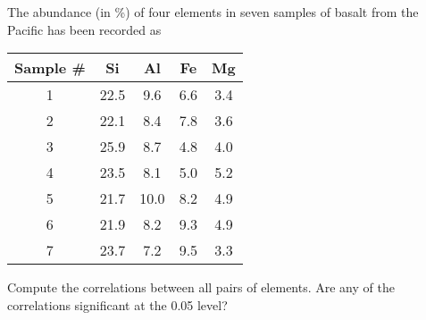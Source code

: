 \begin{problem}
The abundance (in \%) of four elements in seven samples of basalt from the Pacific has been recorded as
\begin{table}[H]
\centering
\begin{tabular}{|c|c|c|c|c|} \hline
\bf{Sample \#}	& \bf{Si} & \bf{Al} & \bf{Fe} & \bf{Mg} \\ \hline
1	& 22.5	& 9.6	& 6.6	& 3.4 \\ \hline
2	& 22.1	& 8.4	& 7.8	& 3.6 \\ \hline
3	& 25.9	& 8.7	& 4.8	& 4.0 \\ \hline
4	& 23.5	& 8.1	& 5.0	& 5.2 \\ \hline
5	& 21.7	& 10.0	& 8.2	& 4.9 \\ \hline
6	& 21.9	& 8.2	& 9.3	& 4.9 \\ \hline
7	& 23.7	& 7.2	& 9.5	& 3.3 \\ \hline
\end{tabular}
\end{table}
Compute the correlations between all pairs of elements.  Are any of the correlations significant at the 0.05 level?
\end{problem}
